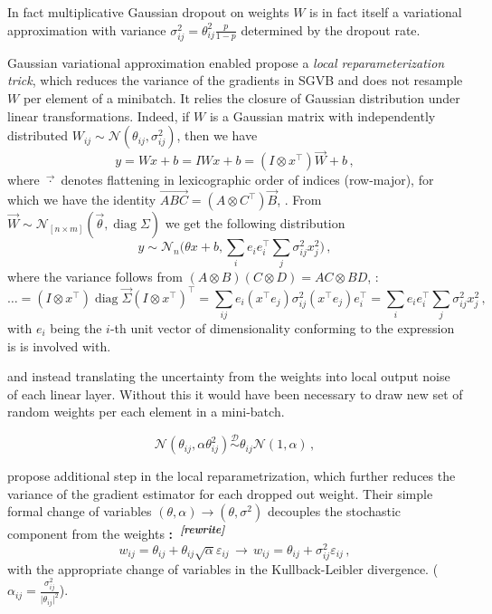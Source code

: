 \documentclass[a4paper,10pt]{article}
\newcommand{\attn}[2]{\textbf{\color{red} #2~\textsuperscript{\textit{[#1]}}}}
\newcommand{\rewrite}[1]{\attn{rewrite}{#1}}
\renewcommand{\vec}{\overrightarrow}
\begin{document}
In fact multiplicative Gaussian dropout on weights $W$ is in fact itself a variational
approximation with variance $\sigma^2_{ij} = \theta_{ij}^2 \tfrac{p}{1-p}$ determined
by the dropout rate.


Gaussian variational approximation enabled \cite{kingma_variational_2015} propose a
\textit{local reparameterization trick}, which reduces the variance of the gradients
in SGVB and does not resample $W$ per element of a minibatch. It relies the closure
of Gaussian distribution under linear transformations. Indeed, if $W$ is a Gaussian
matrix with independently distributed $
  W_{ij} \sim \mathcal{N}(\theta_{ij}, \sigma^2_{ij})
$, then we have
$$
y 
  = W x + b
  = I W x + b
  = (I \otimes x^\top) \vec{W} + b
  \,, $$
where $\vec{\cdot}$ denotes flattening in lexicographic order of indices (row-major),
for which we have the identity $\vec{A B C} = (A \otimes C^\top) \vec{B}$, \cite{cookbook2012}.
From $\vec{W} \sim \mathcal{N}_{[n\times m]}(\vec{\theta}, \mathop{diag}\Sigma)$ we get
the following distribution
$$
y \sim \mathcal{N}_{n}
  \bigl(
    \theta x + b,
    \sum_{i} e_i e_i^\top \sum_j \sigma^2_{ij} x_j^2
  \bigr)
  \,, $$
where the variance follows from $(A\otimes B) (C\otimes D) = AC\otimes BD$, \cite{cookbook2012}:
$$
\ldots
  = (I \otimes x^\top) \mathop{diag}{\vec{\Sigma}} (I \otimes x^\top)^\top
  = \sum_{ij} e_i (x^\top e_j) \sigma^2_{ij} (x^\top e_j) e_i^\top
  = \sum_{i} e_i e_i^\top \sum_j \sigma^2_{ij} x_j^2
  \,, $$
with $e_i$ being the $i$-th unit vector of dimensionality conforming to the expression
is is involved with.


and instead
translating the uncertainty from the weights into local output noise of each linear layer.
Without this it would have been necessary to draw new set of random weights per each element
in a mini-batch.

$$
  \mathcal{N}(\theta_{ij}, \alpha \theta^2_{ij})
  \overset{\mathcal{D}}{\sim}
  \theta_{ij} \mathcal{N}(1, \alpha)
  \,, $$

\cite{molchanov_variational_2017} propose additional step in the local reparametrization,
which further reduces the variance of the gradient estimator for each dropped out
weight. Their simple formal change of variables $(\theta, \alpha) \to (\theta, \sigma^2)$
decouples the stochastic component from the weights \rewrite:
$$
  w_{ij} = \theta_{ij} + \theta_{ij} \sqrt{\alpha} \varepsilon_{ij}
  \,\to\,
  w_{ij} = \theta_{ij} + \sigma^2_{ij} \varepsilon_{ij}
  \,, $$
with the appropriate change of variables in the Kullback-Leibler divergence.
($\alpha_{ij} = \tfrac{\sigma_{ij}^2}{\lvert \theta_{ij}\rvert^2}$).
\end{document}
